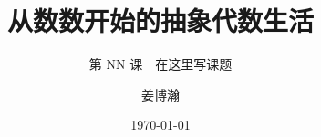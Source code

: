 
\documentclass[10pt]{beamer}
  {}
  {}

\title{从数数开始的抽象代数生活}
\subtitle{第 NN 课　在这里写课题}
\author{姜博瀚}
\date{\today}



\begin{frame}
  \titlepage
\end{frame}


